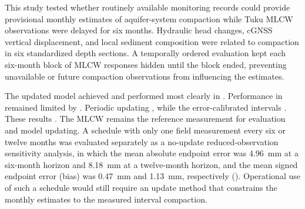 This study tested whether routinely available monitoring records could provide provisional monthly estimates of aquifer-system compaction while Tuku MLCW observations were delayed for six months. Hydraulic head changes, cGNSS vertical displacement, and local sediment composition were related to compaction in six standardized depth sections. A temporally ordered evaluation kept each six-month block of MLCW responses hidden until the block ended, preventing unavailable or future compaction observations from influencing the estimates.

The updated model achieved  and performed most clearly in . Performance in  remained limited by . Periodic updating , while the error-calibrated intervals . These results . The MLCW remains the reference measurement for evaluation and model updating. A schedule with only one field measurement every six or twelve months was evaluated separately as a no-update reduced-observation sensitivity analysis, in which the mean absolute endpoint error was 4.96~mm at a six-month horizon and 8.18~mm at a twelve-month horizon, and the mean signed endpoint error (bias) was 0.47~mm and 1.13~mm, respectively (). Operational use of such a schedule would still require an update method that constrains the monthly estimates to the measured interval compaction.

